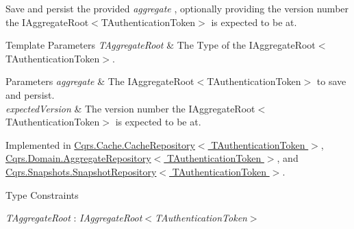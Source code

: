 Save and persist the provided {\itshape aggregate} , optionally providing the version number the I\+Aggregate\+Root$<$\+T\+Authentication\+Token$>$ is expected to be at. 


\begin{DoxyTemplParams}{Template Parameters}
{\em T\+Aggregate\+Root} & The Type of the I\+Aggregate\+Root$<$\+T\+Authentication\+Token$>$.\\
\hline
\end{DoxyTemplParams}

\begin{DoxyParams}{Parameters}
{\em aggregate} & The I\+Aggregate\+Root$<$\+T\+Authentication\+Token$>$ to save and persist.\\
\hline
{\em expected\+Version} & The version number the I\+Aggregate\+Root$<$\+T\+Authentication\+Token$>$ is expected to be at.\\
\hline
\end{DoxyParams}


Implemented in \hyperlink{classCqrs_1_1Cache_1_1CacheRepository_a69df7ee1dc2e4cd38431ab987655eab3_a69df7ee1dc2e4cd38431ab987655eab3}{Cqrs.\+Cache.\+Cache\+Repository$<$ T\+Authentication\+Token $>$}, \hyperlink{classCqrs_1_1Domain_1_1AggregateRepository_aff9e828d19a091a4275f635bee4b3c9b_aff9e828d19a091a4275f635bee4b3c9b}{Cqrs.\+Domain.\+Aggregate\+Repository$<$ T\+Authentication\+Token $>$}, and \hyperlink{classCqrs_1_1Snapshots_1_1SnapshotRepository_a4a7484e7754cae876f0c04e640eb80ff_a4a7484e7754cae876f0c04e640eb80ff}{Cqrs.\+Snapshots.\+Snapshot\+Repository$<$ T\+Authentication\+Token $>$}.

\begin{Desc}
\item[Type Constraints]\begin{description}
\item[{\em T\+Aggregate\+Root} : {\em I\+Aggregate\+Root$<$T\+Authentication\+Token$>$}]\end{description}
\end{Desc}
